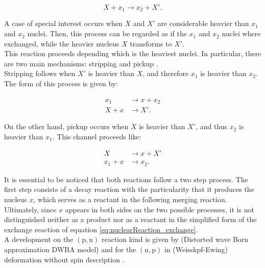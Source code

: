 \documentclass[openany]{book}
\begin{document}
\begin{equation}  \label{eq:nuclearReaction_exchange}
	X +  x_1 \rightarrow x_2 + X'.
\end{equation}

A case of special interest occurs when $X$ and $X'$ are considerable heavier than $x_1$ and $x_2$ nuclei. Then, this process can be regarded as if the $x_1$ and $x_2$ nuclei where exchanged, while the heavier nucleus $X$ transforms to $X'$. \\

This reaction proceeds depending which is the heaviest nuclei. In particular, there are two main mechanisms: stripping and pickup \cite{xu_takahashi_goriely_arnould_ohta_utsunomiya_2013}.\\ 

Stripping follows when $X'$ is heavier than $X$, and therefore $x_1$ is heavier than $x_2$. The form of this process is given by:

\begin{equation}  \label{eq:nuclearReaction_exchange_stripping}
	\begin{split}
		x_1		&\rightarrow x  +  x_2 \\
		X + x 	&\rightarrow X'.
	\end{split}
\end{equation}

On the other hand, pickup  occurs when $X$ is heavier than $X'$, and thus $x_2$ is heavier than $x_1$. This channel proceeds like:
 
 \begin{equation}  \label{eq:nuclearReaction_exchange_pickup}
 	\begin{split}
 		X 			&\rightarrow x + X' \\
 		x_1 + x  &\rightarrow x_2.
 	\end{split}
 \end{equation}

It is essential to be noticed that both reactions follow a two step process. The first step consists of a decay reaction with the particularity that it produces the nucleus $x$, which serves as a reactant in the following merging reaction. Ultimately, since $x$ appears in both sides on the two possible processes,  it is not distinguished neither as a product nor as a reactant in the simplified form of the exchange reaction of equation \ref{eq:nuclearReaction_exchange}. \\

A development on the $\mathrm{(p,n)}$ reaction kind is given by (Distorted wave Born approximation DWBA model) \cite{whitehead_poxon-pearson_nunes_potel_2022} and for the $\mathrm{(n,p)}$ in (Weisskpf-Ewing) deformation without spin description \cite{sharma_gandhi_kumar_2022}. \\
\end{document}
